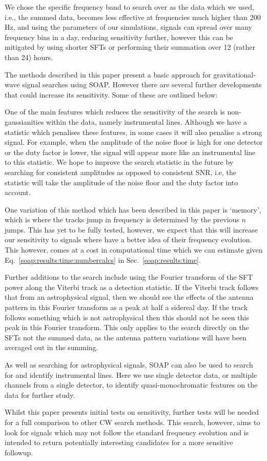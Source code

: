 We chose the specific frequency band to search over as the data which we used, i.e., the summed data, becomes less effective at frequencies much higher than 200\,Hz, and using the parameters of our simulations, signals can spread over many frequency bins in a day, reducing sensitivity further, however this can be mitigated by using shorter \glspl{SFT} or performing their summation over 12 (rather than 24) hours.

%
%
The methods described in this paper present a basic approach for gravitational-wave signal searches using SOAP. However there are several further developments that could increase its sensitivity. Some of these are outlined below:

One of the main features which reduces the sensitivity of the search is non-gaussianities within the data, namely instrumental lines. Although we have a statistic which penalises these features, in some cases it will also penalise a strong signal. For example, when the amplitude of the noise floor is high for one detector or the duty factor is lower, the signal will appear more like an instrumental line to this statistic. We hope to improve the search statistic in the future by searching for consistent amplitudes as opposed to consistent \gls{SNR}, i.e, the statistic will take the amplitude of the noise floor and the duty factor into account.

One variation of this method which has been described in this paper is `memory', which is where the tracks jump in frequency is determined by the previous $n$ jumps. This has yet to be fully tested, however, we expect that this will increase our sensitivity to signals where have a better idea of their frequency evolution. This however, comes at a cost in computational time which we can estimate given Eq.~\ref{soap:results:time:numbercalcs} in Sec.~\ref{soap:results:time}.

Further additions to the search include using the Fourier transform of the \gls{SFT} power along the Viterbi track as a detection statistic.
If the Viterbi track follows that from an astrophysical signal, then we should see the effects of the antenna pattern in this Fourier transform as a peak at half a sidereal day.
If the track follows something which is not astrophysical then this should not be seen this peak in this Fourier transform.
This only applies to the search directly on the \glspl{SFT} not the summed data, as the antenna pattern variations will have been averaged out in the summing.

As well as searching for astrophysical signals, SOAP can also be used to search for and identify instrumental lines. Here we use single detector data, or multiple channels from a single detector, to identify quasi-monochromatic features on the data for further study.

Whilst this paper presents initial tests on sensitivity, further tests will be needed for a full comparison to other \gls{CW} search methods.  
This search, however, aims to look for signals which may not follow the standard
frequency evolution and is intended to return potentially interesting
candidates for a more sensitive followup.

